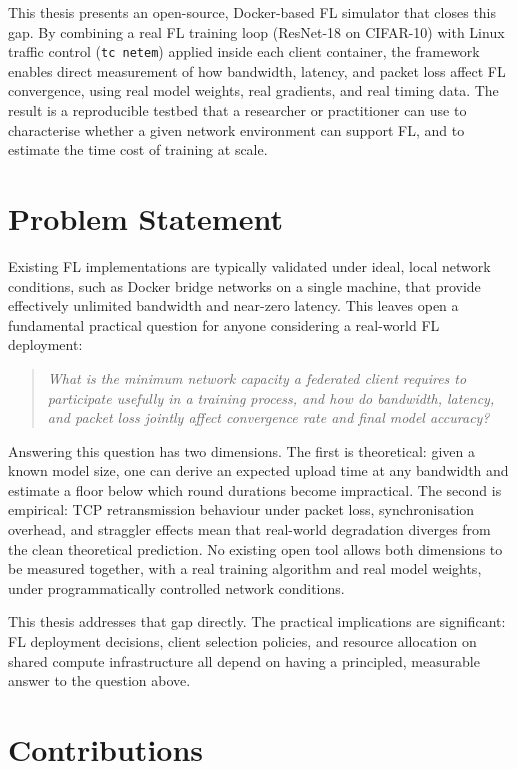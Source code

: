 \documentclass[12pt,a4paper]{report}
\begin{document}
This thesis presents an open-source, Docker-based FL simulator that closes this gap.
By combining a real FL training loop (ResNet-18 on CIFAR-10) with Linux traffic control (\texttt{tc netem})
applied inside each client container, the framework enables direct measurement of how
bandwidth, latency, and packet loss affect FL convergence, using real model weights,
real gradients, and real timing data. The result is a reproducible testbed that a
researcher or practitioner can use to characterise whether a given network environment
can support FL, and to estimate the time cost of training at scale.

\section{Problem Statement}

Existing FL implementations are typically validated under ideal, local network
conditions, such as Docker bridge networks on a single machine, that provide
effectively unlimited bandwidth and near-zero latency. This leaves open a
fundamental practical question for anyone considering a real-world FL deployment:

\begin{quote}
\emph{What is the minimum network capacity a federated client requires to
participate usefully in a training process, and how do bandwidth, latency,
and packet loss jointly affect convergence rate and final model accuracy?}
\end{quote}

Answering this question has two dimensions. The first is theoretical: given a
known model size, one can derive an expected upload time at any bandwidth and
estimate a floor below which round durations become impractical. The second is
empirical: TCP retransmission behaviour under packet loss, synchronisation
overhead, and straggler effects mean that real-world degradation diverges from
the clean theoretical prediction. No existing open tool allows both dimensions
to be measured together, with a real training algorithm and real model weights,
under programmatically controlled network conditions.

This thesis addresses that gap directly. The practical implications are
significant: FL deployment decisions, client selection policies, and resource
allocation on shared compute infrastructure all depend on having a principled,
measurable answer to the question above.

\section{Contributions}
\end{document}
